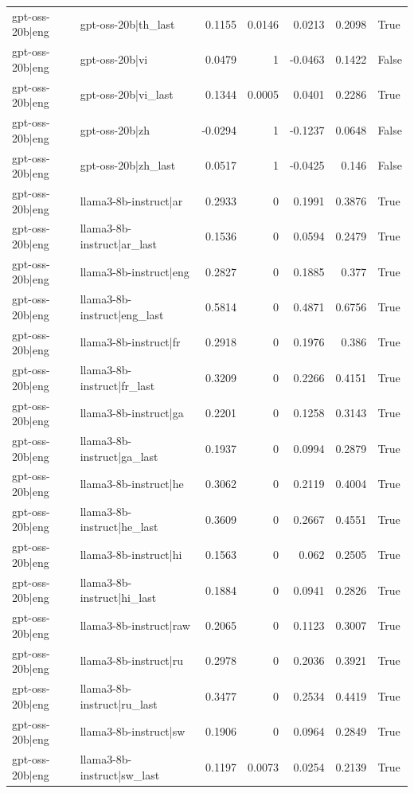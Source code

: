 \begin{table}
\begin{tabular}{l l r r r r l}
gpt-oss-20b|eng & gpt-oss-20b|th_last & 0.1155 & 0.0146 & 0.0213 & 0.2098 & True \\
gpt-oss-20b|eng & gpt-oss-20b|vi & 0.0479 & 1 & -0.0463 & 0.1422 & False \\
gpt-oss-20b|eng & gpt-oss-20b|vi_last & 0.1344 & 0.0005 & 0.0401 & 0.2286 & True \\
gpt-oss-20b|eng & gpt-oss-20b|zh & -0.0294 & 1 & -0.1237 & 0.0648 & False \\
gpt-oss-20b|eng & gpt-oss-20b|zh_last & 0.0517 & 1 & -0.0425 & 0.146 & False \\
gpt-oss-20b|eng & llama3-8b-instruct|ar & 0.2933 & 0 & 0.1991 & 0.3876 & True \\
gpt-oss-20b|eng & llama3-8b-instruct|ar_last & 0.1536 & 0 & 0.0594 & 0.2479 & True \\
gpt-oss-20b|eng & llama3-8b-instruct|eng & 0.2827 & 0 & 0.1885 & 0.377 & True \\
gpt-oss-20b|eng & llama3-8b-instruct|eng_last & 0.5814 & 0 & 0.4871 & 0.6756 & True \\
gpt-oss-20b|eng & llama3-8b-instruct|fr & 0.2918 & 0 & 0.1976 & 0.386 & True \\
gpt-oss-20b|eng & llama3-8b-instruct|fr_last & 0.3209 & 0 & 0.2266 & 0.4151 & True \\
gpt-oss-20b|eng & llama3-8b-instruct|ga & 0.2201 & 0 & 0.1258 & 0.3143 & True \\
gpt-oss-20b|eng & llama3-8b-instruct|ga_last & 0.1937 & 0 & 0.0994 & 0.2879 & True \\
gpt-oss-20b|eng & llama3-8b-instruct|he & 0.3062 & 0 & 0.2119 & 0.4004 & True \\
gpt-oss-20b|eng & llama3-8b-instruct|he_last & 0.3609 & 0 & 0.2667 & 0.4551 & True \\
gpt-oss-20b|eng & llama3-8b-instruct|hi & 0.1563 & 0 & 0.062 & 0.2505 & True \\
gpt-oss-20b|eng & llama3-8b-instruct|hi_last & 0.1884 & 0 & 0.0941 & 0.2826 & True \\
gpt-oss-20b|eng & llama3-8b-instruct|raw & 0.2065 & 0 & 0.1123 & 0.3007 & True \\
gpt-oss-20b|eng & llama3-8b-instruct|ru & 0.2978 & 0 & 0.2036 & 0.3921 & True \\
gpt-oss-20b|eng & llama3-8b-instruct|ru_last & 0.3477 & 0 & 0.2534 & 0.4419 & True \\
gpt-oss-20b|eng & llama3-8b-instruct|sw & 0.1906 & 0 & 0.0964 & 0.2849 & True \\
gpt-oss-20b|eng & llama3-8b-instruct|sw_last & 0.1197 & 0.0073 & 0.0254 & 0.2139 & True \\

\end{tabular}
\end{table}
